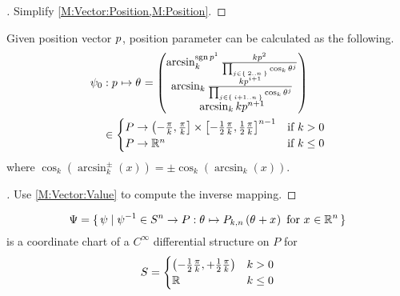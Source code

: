 \documentclass[stu, babel, american, biblatex, a4paper, leqno, draftall]{apa7}
\begin{document}
\begin{proof}[]
    Simplify \cref{M:Vector:Position,M:Position}.
\end{proof}
\begin{lemma}\label{M:Parameter:Value}
    Given position vector $\tensor{p}{}$, position parameter can be calculated as the following.
    \begin{align*}
        \psi_0
         & : \tensor{p}{} \mapsto \tensor{\theta}{}
        =
        \begin{pmatrix}
            \arcsin_k^{\sign{\tensor{p}{^1}}}{\frac{k\tensor{p}{^2}}{\prod_{j\in\Set{2..n}}{\cos_k{\tensor{\theta}{^j}}}}} \\
            \arcsin_k{\frac{k\tensor{p}{^{i+1}}}{\prod_{j\in\Set{i+1..n}}{\cos_k{\tensor{\theta}{^j}}}}}                   \\
            \arcsin_k{k\tensor{p}{^{n+1}}}                                                                                 \\
        \end{pmatrix}                  \\
         & \in
        \begin{cases}
            P \to \left(-\frac{\pi}{k}, \frac{\pi}{k}\right]\times\left[-\frac{1}{2}\frac{\pi}{k}, \frac{1}{2}\frac{\pi}{k}\right]^{n-1} & \text{if $k>0$}   \\
            P \to \R^{n}                                                                                                              & \text{if $k\le0$} \\
        \end{cases}
    \end{align*}
    where $\cos_k\left(\arcsin_k^{\pm}\left(x\right)\right) = \pm \cos_k\left(\arcsin_k\left(x\right)\right)$.
\end{lemma}
\begin{proof}[]
    \skipped

    Use \cref{M:Vector:Value} to compute the inverse mapping.
\end{proof}
\begin{lemma}\label{M:CoordinateChart}
    \begin{equation*}
        \Psi=\set{\psi|
            \psi^{-1}
            \in S^n \to P
            :\tensor{\theta}{}\mapsto P_{k,n}\left(\tensor{\theta}{}+\tensor{x}{}\right)
            \text{ for }
            \tensor{x}{} \in \R^n
        }
    \end{equation*} is a coordinate chart of a $C^\infty$ differential structure on $P$
    for \begin{equation*}
        S=
        \begin{cases}
            \left(-\frac{1}{2}\frac{\pi}{k},+\frac{1}{2}\frac{\pi}{k}\right) & \text{$k>0$} \\
            \mathbb{R} & \text{$k\le0$}
        \end{cases}
    \end{equation*}
\end{lemma}
\end{document}
